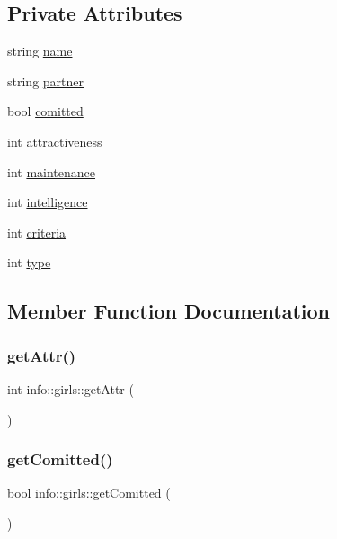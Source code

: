 \subsection*{Private Attributes}
\begin{DoxyCompactItemize}
\item 
string \hyperlink{classinfo_1_1girls_a80c6a089a13c5e524349308b9ffacc95}{name}
\item 
string \hyperlink{classinfo_1_1girls_a3eae9023ed6e3232e784048d91bcadf6}{partner}
\item 
bool \hyperlink{classinfo_1_1girls_a4d381e147218e282328908caa01bc846}{comitted}
\item 
int \hyperlink{classinfo_1_1girls_ab19066d4f3a98b9e97d32d7b58dd6761}{attractiveness}
\item 
int \hyperlink{classinfo_1_1girls_a9b5721254d396c5f6ebdf9025b97f9ff}{maintenance}
\item 
int \hyperlink{classinfo_1_1girls_a398cbcf12917d7d37f18c072907e63b9}{intelligence}
\item 
int \hyperlink{classinfo_1_1girls_a1a1ffcfe3a2450242b8bd7ac590928c0}{criteria}
\item 
int \hyperlink{classinfo_1_1girls_a849be918567f7694dbad760c469fa5b3}{type}
\end{DoxyCompactItemize}


\subsection{Member Function Documentation}
\mbox{\label{classinfo_1_1girls_a19bf094e16a60b155e8118c29423ec40}} 
\subsubsection{\texorpdfstring{get\+Attr()}{getAttr()}}
{\footnotesize\ttfamily int info\+::girls\+::get\+Attr (\begin{DoxyParamCaption}{ }\end{DoxyParamCaption})}

\mbox{\label{classinfo_1_1girls_a1795204bb337a0b3a826ec9f91d3205d}} 
\subsubsection{\texorpdfstring{get\+Comitted()}{getComitted()}}
{\footnotesize\ttfamily bool info\+::girls\+::get\+Comitted (\begin{DoxyParamCaption}{ }\end{DoxyParamCaption})}

